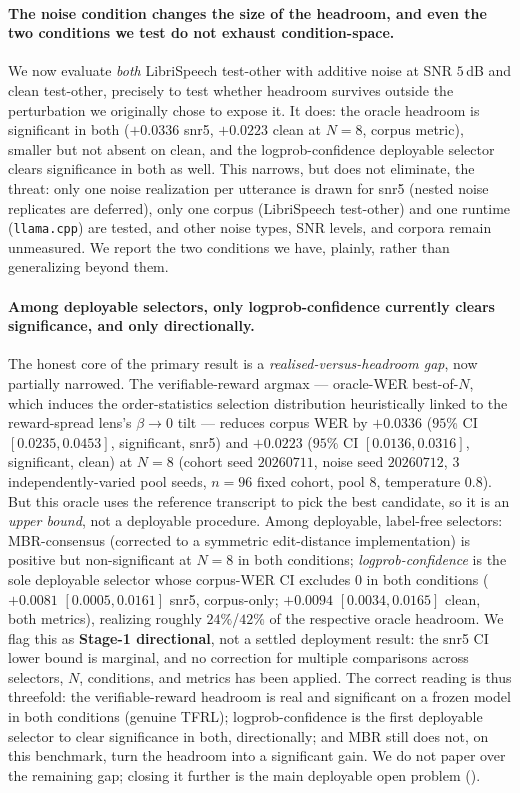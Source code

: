 \paragraph{The noise condition changes the size of the headroom, and even the two conditions we test do not exhaust condition-space.}
We now evaluate \emph{both} LibriSpeech test-other with additive noise at SNR $5$\,dB and clean
test-other, precisely to test whether headroom survives outside the perturbation we originally chose to
expose it. It does: the oracle headroom is significant in both ($+0.0336$ snr5, $+0.0223$ clean at
$N{=}8$, corpus metric), smaller but not absent on clean, and the logprob-confidence deployable selector
clears significance in both as well. This narrows, but does not eliminate, the threat: only one noise
realization per utterance is drawn for snr5 (nested noise replicates are deferred), only one corpus
(LibriSpeech test-other) and one runtime (\texttt{llama.cpp}) are tested, and other noise types, SNR
levels, and corpora remain unmeasured. We report the two conditions we have, plainly, rather than
generalizing beyond them.

\paragraph{Among deployable selectors, only logprob-confidence currently clears significance, and only directionally.}
The honest core of the primary result is a \emph{realised-versus-headroom gap}, now partially narrowed.
The verifiable-reward argmax --- oracle-WER best-of-$N$, which induces the order-statistics selection
distribution heuristically linked to the reward-spread lens's $\beta\!\to\!0$ tilt --- reduces corpus WER
by $+0.0336$ ($95\%$ CI $[0.0235,0.0453]$, significant, snr5) and $+0.0223$ ($95\%$ CI $[0.0136,0.0316]$,
significant, clean) at $N{=}8$ (cohort seed $20260711$, noise seed $20260712$, $3$ independently-varied
pool seeds, $n{=}96$ fixed cohort, pool $8$, temperature $0.8$). But this oracle uses the reference
transcript to pick the best candidate, so it is an \emph{upper bound}, not a deployable procedure. Among
deployable, label-free selectors: MBR-consensus (corrected to a symmetric edit-distance implementation)
is positive but non-significant at $N{=}8$ in both conditions; \emph{logprob-confidence} is the sole
deployable selector whose corpus-WER CI excludes $0$ in both conditions ($+0.0081$ $[0.0005,0.0161]$
snr5, corpus-only; $+0.0094$ $[0.0034,0.0165]$ clean, both metrics), realizing roughly $24\%$/$42\%$ of
the respective oracle headroom. We flag this as \textbf{Stage-1 directional}, not a settled deployment
result: the snr5 CI lower bound is marginal, and no correction for multiple comparisons across selectors,
$N$, conditions, and metrics has been applied. The correct reading is thus threefold: the
verifiable-reward headroom is real and significant on a frozen model in both conditions (genuine TFRL);
logprob-confidence is the first deployable selector to clear significance in both, directionally; and MBR
still does not, on this benchmark, turn the headroom into a significant gain. We do not paper over the
remaining gap; closing it further is the main deployable open problem ().

